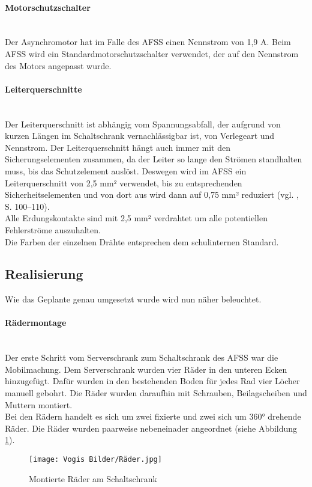     \paragraph{Motorschutzschalter}\mbox{}\\
    Der Asynchromotor hat im Falle des AFSS einen Nennstrom von 1,9 A. Beim AFSS wird ein Standardmotorschutzschalter verwendet, der auf den Nennstrom des Motors angepasst wurde. 
    \paragraph{Leiterquerschnitte}\mbox{}\\
    Der Leiterquerschnitt ist abhängig vom Spannungsabfall, der aufgrund von kurzen Längen im Schaltschrank vernachlässigbar ist, von Verlegeart und Nennstrom. Der Leiterquerschnitt hängt auch immer mit den Sicherungselementen zusammen, da der Leiter so lange den Strömen standhalten muss, bis das Schutzelement auslöst. Deswegen wird im AFSS ein Leiterquerschnitt von 2,5 mm² verwendet, bis zu entsprechenden Sicherheitselementen und von dort aus wird dann auf 0,75 mm² reduziert (vgl. \cite{SeyrRösch}, S. 100–110).\\ 
    Alle Erdungskontakte sind mit 2,5 mm² verdrahtet um alle potentiellen Fehlerströme auszuhalten.\\
    Die Farben der einzelnen Drähte entsprechen dem schulinternen Standard.
\subsection{Realisierung}
    Wie das Geplante genau umgesetzt wurde wird nun näher beleuchtet.
    \paragraph{Rädermontage}\mbox{}\\
    Der erste Schritt vom Serverschrank zum Schaltschrank des AFSS war die Mobilmachung. Dem Serverschrank wurden vier Räder in den unteren Ecken hinzugefügt. Dafür wurden in den bestehenden Boden für jedes Rad vier Löcher manuell gebohrt. Die Räder wurden daraufhin mit Schrauben, Beilagscheiben und Muttern montiert.\\
    Bei den Rädern handelt es sich um zwei fixierte und zwei sich um 360° drehende Räder. Die Räder wurden paarweise nebeneinader angeordnet (siehe Abbildung \ref{fig:Raeder_montiert}).
    \begin{figure}[h]
        \centering
        \texttt{[image: Vogis Bilder/Räder.jpg]}
        \caption{Montierte Räder am Schaltschrank}
        \label{fig:Raeder_montiert}
    \end{figure}
